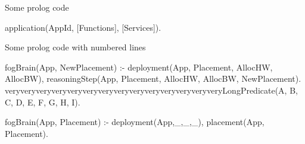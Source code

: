 \documentclass{article}
\author{}
\title{}
\begin{document}
Some prolog code

\begin{code} 
application(AppId, [Functions], [Services]).
\end{code}

Some prolog code with numbered lines

\begin{codeNum}[firstnumber=1, breaklines]
fogBrain(App, NewPlacement) :-
deployment(App, Placement, AllocHW, AllocBW),
reasoningStep(App, Placement, AllocHW, AllocBW, NewPlacement).
veryveryveryveryveryveryveryveryveryveryveryveryveryveryLongPredicate(A, B, C, D, E, F, G, H, I).

fogBrain(App, Placement) :-
\+deployment(App,_,_,_),
placement(App, Placement).
\end{codeNum}
\end{document}
